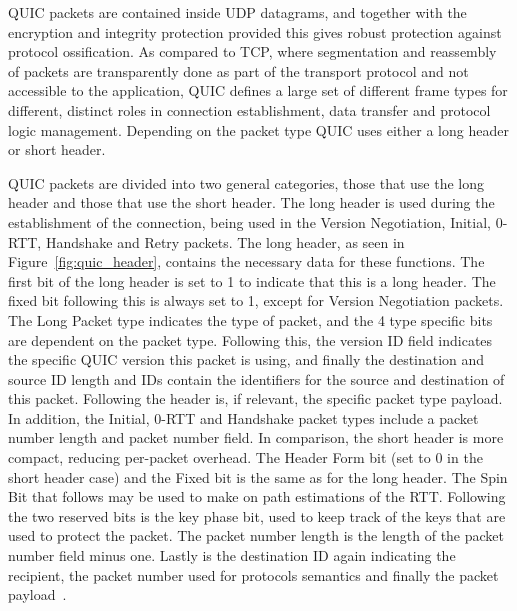 \documentclass[english, 12pt, a4paper, elec, utf8, a-2b, online]{aaltothesis}
\begin{document}
QUIC packets are contained inside UDP datagrams, and together with the encryption
and integrity protection provided this gives robust protection against protocol
ossification. As compared to TCP, where segmentation and reassembly of packets are
transparently done as part of the transport protocol and not accessible to the
application, QUIC defines a large set of different frame types for different,
distinct roles in connection establishment, data transfer and protocol logic
management. Depending on the packet type QUIC uses either a long header or short
header.

QUIC packets are divided into two general categories, those that use the long header
and those that use the short header. The long header is used during the establishment
of the connection, being used in the Version Negotiation, Initial, 0-RTT, Handshake
and Retry packets. The long header, as seen in Figure~\ref{fig:quic_header}, contains the
necessary data for these functions. The first bit of the long header is set to 1 to indicate
that this is a long header. The fixed bit following this is always set to 1, except
for Version Negotiation packets. The Long Packet type indicates the type of packet,
and the 4 type specific bits are dependent on the packet type. Following this,
the version ID field indicates the specific QUIC version this packet is using, and
finally the destination and source ID length and IDs contain the identifiers for
the source and destination of this packet. Following the header is, if relevant,
the specific packet type payload. In addition, the Initial, 0-RTT and Handshake
packet types include a packet number length and packet number field. In comparison,
the short header is more compact, reducing per-packet overhead. The Header Form bit
(set to 0 in the short header case) and the Fixed bit is the same as for the long
header. The Spin Bit that follows may be used to make on path estimations of
the RTT. Following the two reserved bits is the key phase bit, used to keep
track of the keys that are used to protect the packet. The packet number length
is the length of the packet number field minus one. Lastly is the destination ID
again indicating the recipient, the packet number used for protocols semantics
and finally the packet payload~\cite{rfc9000}.
\end{document}
